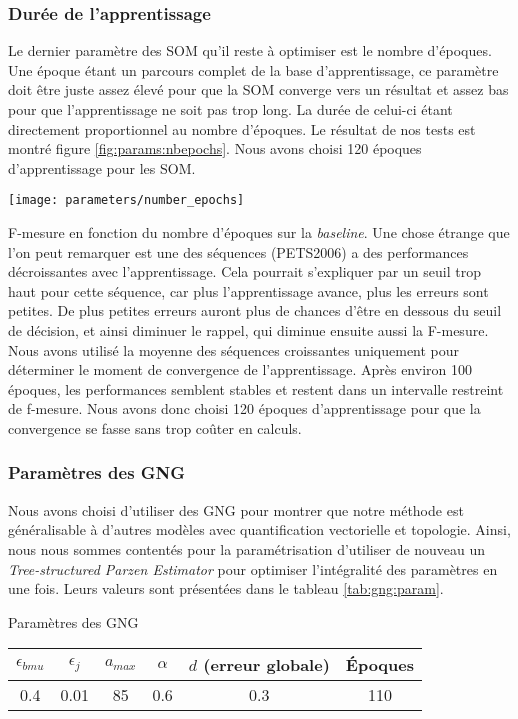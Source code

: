 	\subsubsection{Durée de l'apprentissage}

	Le dernier paramètre des SOM qu'il reste à optimiser est le nombre d'époques. Une époque étant un parcours complet de la base d'apprentissage, ce paramètre doit être juste assez élevé pour que la SOM converge vers un résultat et assez bas pour que l'apprentissage ne soit pas trop long. La durée de celui-ci étant directement proportionnel au nombre d'époques. Le résultat de nos tests est montré figure \ref{fig:params:nbepochs}. Nous avons choisi 120 époques d'apprentissage pour les SOM.

	\begin{figureth}
		\texttt{[image: parameters/number\_epochs]}
		\caption[Nombre d'époques]{F-mesure en fonction du nombre d'époques sur la \textit{baseline}. Une chose étrange que l'on peut remarquer est une des séquences (PETS2006) a des performances décroissantes avec l'apprentissage. Cela pourrait s'expliquer par un seuil trop haut pour cette séquence, car plus l'apprentissage avance, plus les erreurs sont petites. De plus petites erreurs auront plus de chances d'être en dessous du seuil de décision, et ainsi diminuer le rappel, qui diminue ensuite aussi la F-mesure. Nous avons utilisé la moyenne des séquences croissantes uniquement pour déterminer le moment de convergence de l'apprentissage. Après environ 100 époques, les performances semblent stables et restent dans un intervalle restreint de f-mesure. Nous avons donc choisi 120 époques d'apprentissage pour que la convergence se fasse sans trop coûter en calculs.}\label{fig:params:nbepochs}
	\end{figureth}

	\subsubsection{Paramètres des GNG}

	Nous avons choisi d'utiliser des GNG pour montrer que notre méthode est généralisable à d'autres modèles avec quantification vectorielle et topologie. Ainsi, nous nous sommes contentés pour la paramétrisation d'utiliser de nouveau un \textit{Tree-structured Parzen Estimator} pour optimiser l'intégralité des paramètres en une fois. Leurs valeurs sont présentées dans le tableau \ref{tab:gng:param}.

	\begin{tableth}
	\caption[Paramètres GNG]{Paramètres des GNG}
	\begin{tabular}{|c|c|c|c|c|c|}
		\hline
		$\epsilon_{bmu}$ & $\epsilon_{j}$ & $a_{max}$ & $\alpha$ & $d$ (erreur globale) & Époques\\
		\hline
		0.4 & 0.01 & 85 & 0.6 & 0.3 & 110\\
		\hline
	\end{tabular}\label{tab:gng:param}
	\end{tableth}

